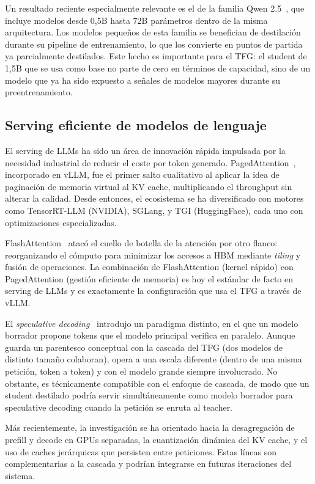 \documentclass[11pt,a4paper]{article}
\begin{document}
Un resultado reciente especialmente relevante es el de la familia Qwen 2.5~\cite{qwen2}, que incluye modelos desde 0,5B hasta 72B parámetros dentro de la misma arquitectura. Los modelos pequeños de esta familia se benefician de destilación durante su pipeline de entrenamiento, lo que los convierte en puntos de partida ya parcialmente destilados. Este hecho es importante para el TFG: el student de 1,5B que se usa como base no parte de cero en términos de capacidad, sino de un modelo que ya ha sido expuesto a señales de modelos mayores durante su preentrenamiento.

\subsection{Serving eficiente de modelos de lenguaje}

El serving de LLMs ha sido un área de innovación rápida impulsada por la necesidad industrial de reducir el coste por token generado. PagedAttention~\cite{vllm2023}, incorporado en vLLM, fue el primer salto cualitativo al aplicar la idea de paginación de memoria virtual al KV cache, multiplicando el throughput sin alterar la calidad. Desde entonces, el ecosistema se ha diversificado con motores como TensorRT-LLM (NVIDIA), SGLang, y TGI (HuggingFace), cada uno con optimizaciones especializadas.

FlashAttention~\cite{dao2022flashattention, dao2023flash2} atacó el cuello de botella de la atención por otro flanco: reorganizando el cómputo para minimizar los accesos a HBM mediante \textit{tiling} y fusión de operaciones. La combinación de FlashAttention (kernel rápido) con PagedAttention (gestión eficiente de memoria) es hoy el estándar de facto en serving de LLMs y es exactamente la configuración que usa el TFG a través de vLLM.

El \textit{speculative decoding}~\cite{leviathan2023speculative} introdujo un paradigma distinto, en el que un modelo borrador propone tokens que el modelo principal verifica en paralelo. Aunque guarda un parentesco conceptual con la cascada del TFG (dos modelos de distinto tamaño colaboran), opera a una escala diferente (dentro de una misma petición, token a token) y con el modelo grande siempre involucrado. No obstante, es técnicamente compatible con el enfoque de cascada, de modo que un student destilado podría servir simultáneamente como modelo borrador para speculative decoding cuando la petición se enruta al teacher.

Más recientemente, la investigación se ha orientado hacia la desagregación de prefill y decode en GPUs separadas, la cuantización dinámica del KV cache, y el uso de caches jerárquicas que persisten entre peticiones. Estas líneas son complementarias a la cascada y podrían integrarse en futuras iteraciones del sistema.
\end{document}
